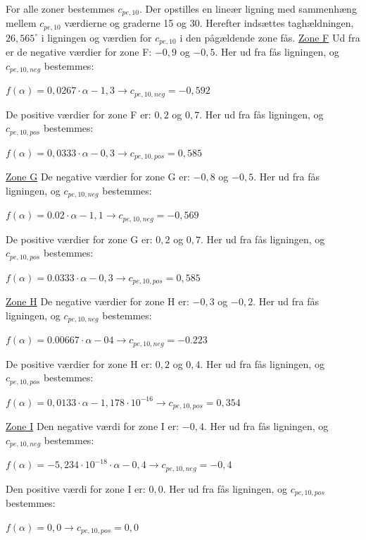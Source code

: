 For alle zoner bestemmes $c_{pe,10}$. Der opstilles en lineær ligning med sammenhæng mellem $c_{pe,10}$ værdierne og graderne 15 og 30. Herefter indsættes taghældningen, $26,\!565^{\circ}$ i ligningen og værdien for $c_{pe,10}$ i den pågældende zone fås.
\newline
\newline
\underline{Zone F}
\newline
Ud fra \citep[ tabel 7.4a kapitel 7.2.5]{EU91} er de negative værdier for zone F: $-0,\!9$ og $-0,\!5$. Her ud fra fås ligningen, og $c_{pe,10,neg}$ bestemmes:
\begin{center}
	$f(\alpha)=0,\!0267\cdot \alpha - 1,\!3 \to c_{pe,10,neg}=-0,\!592$
\end{center}
De positive værdier for zone F er: $0,\!2$ og $0,\!7$. Her ud fra fås ligningen, og $c_{pe,10,pos}$ bestemmes:
\begin{center}
	$f(\alpha)=0,\!0333\cdot \alpha - 0,\!3 \to c_{pe,10,pos}=0,\!585$
\end{center}

\underline{Zone G}
\newline
De negative værdier for zone G er: $-0,\!8$ og $-0,\!5$. Her ud fra fås ligningen, og $c_{pe,10,neg}$ bestemmes:
\begin{center}
	$f(\alpha)=0.02\cdot \alpha - 1,\!1 \to c_{pe,10,neg}=-0,\!569$
\end{center}
De positive værdier for zone G er: $0,\!2$ og $0,\!7$. Her ud fra fås ligningen, og $c_{pe,10,pos}$ bestemmes:
\begin{center}
	$f(\alpha)=0.0333\cdot \alpha - 0,\!3 \to c_{pe,10,pos}=0,\!585$
\end{center}

\underline{Zone H}
\newline
De negative værdier for zone H er: $-0,\!3$ og $-0,\!2$. Her ud fra fås ligningen, og $c_{pe,10,neg}$ bestemmes:
\begin{center}
	$f(\alpha)=0.00667\cdot \alpha - 0\!4 \to c_{pe,10,neg}=-0.223$
\end{center}
De positive værdier for zone H er: $0,\!2$ og $0,\!4$. Her ud fra fås ligningen, og $c_{pe,10,pos}$ bestemmes:
\begin{center}
	$f(\alpha)=0,\!0133\cdot \alpha - 1,\!178\cdot 10^{-16} \to c_{pe,10,pos}=0,\!354$
\end{center}

\underline{Zone I}
\newline
Den negative værdi for zone I er: $-0,\!4$. Her ud fra fås ligningen, og $c_{pe,10,neg}$ bestemmes:
\begin{center}
	$f(\alpha)=-5,\!234\cdot 10^{-18}\cdot \alpha - 0,\!4 \to c_{pe,10,neg}=-0,\!4$
\end{center}
Den positive værdi for zone I er: $0,\!0$. Her ud fra fås ligningen, og $c_{pe,10,pos}$ bestemmes:
\begin{center}
	$f(\alpha)=0,\!0 \to c_{pe,10,pos}=0,\!0$
\end{center}

